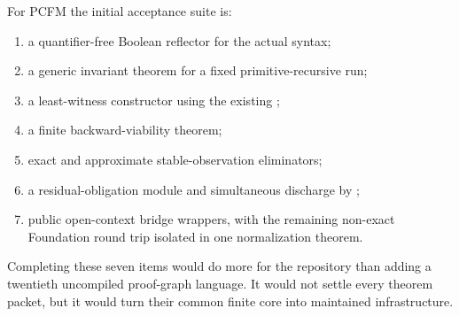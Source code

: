 For PCFM the initial acceptance suite is:

\begin{enumerate}
\item a quantifier-free Boolean reflector for the actual  syntax;
\item a generic invariant theorem for a fixed primitive-recursive run;
\item a least-witness constructor using the existing ;
\item a finite backward-viability theorem;
\item exact and approximate stable-observation eliminators;
\item a residual-obligation module and simultaneous discharge by
;
\item public open-context bridge wrappers, with the remaining non-exact
Foundation round trip isolated in one normalization theorem.
\end{enumerate}

Completing these seven items would do more for the repository than adding a
twentieth uncompiled proof-graph language.  It would not settle every theorem
packet, but it would turn their common finite core into maintained
infrastructure.
